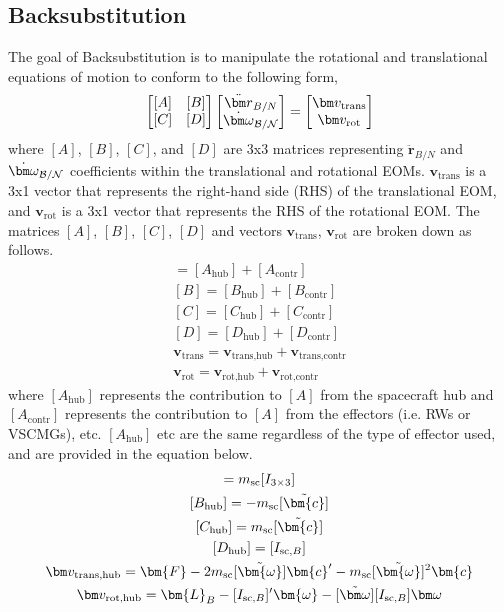\subsection{Backsubstitution}
The goal of Backsubstitution is to manipulate the rotational and translational equations of motion to conform to the following form,
\begin{equation}
\begin{bmatrix}
[A] & [B]\\
[C] & [D]
\end{bmatrix} \begin{bmatrix}
\ddot{\bm r}_{B/N}\\
\dot{\bm\omega}_{\cal B/N}
\end{bmatrix} = \begin{bmatrix}
\bm v_{\text{trans}}\\
\bm v_{\text{rot}}
\end{bmatrix}
\label{eq:backsub}
\end{equation}
where $[A]$, $[B]$, $[C]$, and $[D]$ are 3x3 matrices representing $\ddot{\bm r}_{B/N}$ and $\dot{\bm\omega}_{\cal B/N}$ coefficients within the translational and rotational EOMs. $\bm v_{\text{trans}}$ is a 3x1 vector that represents the right-hand side (RHS) of the translational EOM, and $\bm v_{\text{rot}}$ is a 3x1 vector that represents the RHS of the rotational EOM. The matrices $[A]$, $[B]$, $[C]$, $[D]$ and vectors $\bm v_{\text{trans}}$, $\bm v_{\text{rot}}$ are broken down as follows.
\begin{gather}
[A] = [A_\text{hub}] + [A_\text{contr}]
\\
[B] = [B_\text{hub}] + [B_\text{contr}]
\\
[C] = [C_\text{hub}] + [C_\text{contr}]
\\
[D] = [D_\text{hub}] + [D_\text{contr}]
\\
\bm v_{\text{trans}} = \bm v_{\text{trans,hub}} + \bm v_{\text{trans,contr}}
\\
\bm v_{\text{rot}} = \bm v_{\text{rot,hub}} + \bm v_{\text{rot,contr}}
\end{gather}
where $[A_\text{hub}]$ represents the contribution to $[A]$ from the spacecraft hub and $[A_\text{contr}]$ represents the contribution to $[A]$ from the effectors (i.e. RWs or VSCMGs), etc. $[A_\text{hub}]$ etc are the same regardless of the type of effector used, and are provided in the equation below.
\begin{gather}
[A_\text{hub}] = m_{\text{sc}}[I_{3\times3}]
\\
[B_\text{hub}] = -m_{\text{sc}}[\tilde{\bm{c}}]
\\
[C_\text{hub}] = m_{\text{\text{sc}}}[\tilde{\bm{c}}]
\\
[D_\text{hub}] = [I_{\text{sc},B}]
\\
\bm v_{\text{trans,hub}} = \bm{F} - 2m_{\text{sc}}[\tilde{\bm{\omega}}]\bm{c}' - m_{\text{sc}}[\tilde{\bm{\omega}}]^2\bm{c}
\\
\bm v_{\text{rot,hub}} = \bm{L}_B - [I_{\text{sc},B}]'\bm{\omega} - [\tilde{\bm\omega}][I_{\text{sc},B}]\bm\omega
\end{gather}

